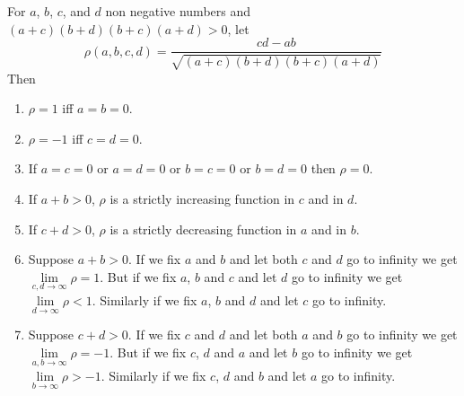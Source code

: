 \documentclass{article}
\begin{document}
\begin{proposition}
For $a$, $b$, $c$, and $d$ non negative numbers and $(a+c)(b+d)(b+c)(a+d)>0$, let 
\begin{equation}
\rho(a,b,c,d)=\frac{cd-ab}{\sqrt{(a+c)(b+d)(b+c)(a+d)}}
\end{equation}
Then
\begin{enumerate}
  \item $\rho=1$ iff $a=b=0$.
  \item $\rho=-1$ iff $c=d=0$.
  \item If $a=c=0$ or $a=d=0$ or $b=c=0$ or $b=d=0$ then $\rho=0$.
   \item If $a+b>0$, $\rho$ is a strictly increasing function in $c$ and in $d$.
   \item If $c+d>0$, $\rho$ is a strictly decreasing function in $a$ and in $b$.
   \item Suppose $a+b>0$. If we fix $a$ and $b$ and let
   both $c$ and $d$ go
   to infinity we get $\lim\limits_{c,d\to\infty}\rho=1$. But if we fix $a$, $b$
   and $c$ and let $d$ go to infinity we get $\lim\limits_{d\to\infty}\rho<1$.
   Similarly if we fix $a$, $b$ and $d$ and let $c$ go to infinity.
   \item Suppose $c+d>0$. If we fix $c$ and $d$ and let
   both $a$ and $b$ go
   to infinity we get $\lim\limits_{a,b\to\infty}\rho=-1$. But if we fix $c$, $d$
   and $a$ and let $b$ go to infinity we get $\lim\limits_{b\to\infty}\rho>-1$.
   Similarly if we fix $c$, $d$ and $b$ and let $a$ go to infinity.
   
\end{enumerate}
\end{proposition}
\end{document}
